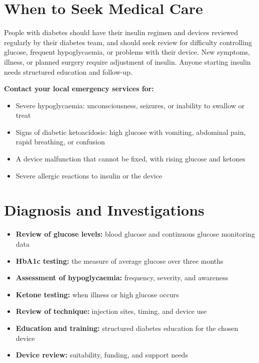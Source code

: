 \section*{When to Seek Medical Care}
People with diabetes should have their insulin regimen and devices reviewed regularly by their diabetes team, and should seek review for difficulty controlling glucose, frequent hypoglycaemia, or problems with their device. New symptoms, illness, or planned surgery require adjustment of insulin. Anyone starting insulin needs structured education and follow-up.

\textbf{Contact your local emergency services for:}
\begin{itemize}
    \item Severe hypoglycaemia: unconsciousness, seizures, or inability to swallow or treat
    \item Signs of diabetic ketoacidosis: high glucose with vomiting, abdominal pain, rapid breathing, or confusion
    \item A device malfunction that cannot be fixed, with rising glucose and ketones
    \item Severe allergic reactions to insulin or the device
\end{itemize}

\section*{Diagnosis and Investigations}
\begin{itemize}
    \item \textbf{Review of glucose levels:} blood glucose and continuous glucose monitoring data
    \item \textbf{HbA1c testing:} the measure of average glucose over three months
    \item \textbf{Assessment of hypoglycaemia:} frequency, severity, and awareness
    \item \textbf{Ketone testing:} when illness or high glucose occurs
    \item \textbf{Review of technique:} injection sites, timing, and device use
    \item \textbf{Education and training:} structured diabetes education for the chosen device
    \item \textbf{Device review:} suitability, funding, and support needs
\end{itemize}

